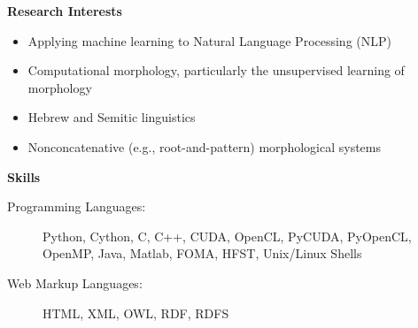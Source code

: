 \begin{singlespace}
\centerline{\textbf{\large Research Interests}}
\begin{itemize}[label=\textbullet, leftmargin=*, itemsep=.01pt]
\item Applying machine learning to Natural Language Processing (NLP)
\item Computational morphology, particularly the unsupervised learning of morphology
\item Hebrew and Semitic linguistics
\item Nonconcatenative (e.g., root-and-pattern) morphological systems
\end{itemize}
\vspace{10pt}
\centerline{\large \textbf{Skills}}
\begin{description}
\item[Programming Languages:]
Python, Cython, C, C++, CUDA, OpenCL, PyCUDA, PyOpenCL, OpenMP, Java, Matlab, FOMA, HFST, Unix/Linux Shells 
\item[Web Markup Languages:] HTML, XML, OWL, RDF, RDFS

\end{description}
\end{singlespace}
